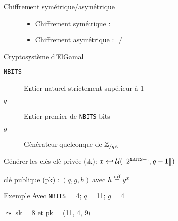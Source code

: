 \documentclass[10pt, compress]{beamer}
\begin{document}
  \begin{frame}{Chiffrement symétrique/asymétrique}
    \bigbreak
    \begin{figure}
      \begin{itemize}
        \item Chiffrement symétrique : \textcolor{exampleBox}{\faKey} $=$ \faKey
        \item Chiffrement asymétrique : \textcolor{exampleBox}{\faKey} $\neq$ \faKey
      \end{itemize}
    \end{figure}
    
  \end{frame}

  \begin{frame}{Cryptosystème d'ElGamal}
    \begin{description}
      \item[\texttt{NBITS}] Entier naturel strictement supérieur à 1 
      \item[$q$] Entier premier de \texttt{NBITS} bits
      \item[$g$] Générateur quelconque de \(\Z_{/q\Z}\)
    \end{description}
    \begin{alertblock}{Générer les clés}
      clé privée (sk): \(x\hookleftarrow\UU(\ie{2^{\texttt{NBITS}-1}, q-1})\)

      clé publique (pk) : \((q, g, h)\) avec \(h\egdef g^x\)
    \end{alertblock}
    \begin{exampleblock}{Exemple}
      Avec \texttt{NBITS} = 4; $q$ = 11; $g$ = 4
      
      $\leadsto$ sk = 8 et pk = (11, 4, 9)
    \end{exampleblock}
  \end{frame}
\end{document}
